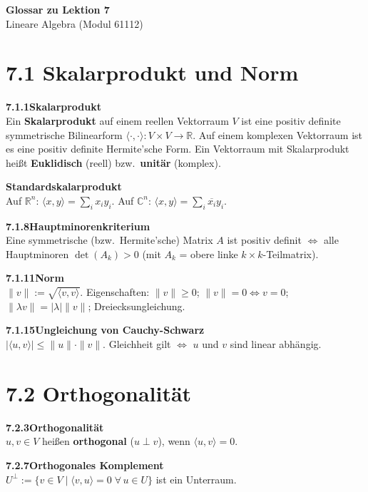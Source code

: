\documentclass[a4paper,12pt]{article}
\newcommand{\gentry}[3]{%
  \noindent\textbf{#1\quad #2}\nopagebreak\\[0.2em]
  #3\par\smallskip
}
\begin{document}
\begin{center}
  {\LARGE\bfseries Glossar zu Lektion 7}\\[0.5em]
  {\large Lineare Algebra (Modul 61112)}
\end{center}

\vspace{0.8em}

\section*{7.1 \quad Skalarprodukt und Norm}

\gentry{7.1.1}{Skalarprodukt}{%
  Ein \textbf{Skalarprodukt} auf einem reellen Vektorraum $V$ ist eine positiv definite symmetrische Bilinearform $\langle \cdot, \cdot\rangle: V \times V \to \mathbb{R}$.
  Auf einem komplexen Vektorraum ist es eine positiv definite Hermite'sche Form.
  Ein Vektorraum mit Skalarprodukt heißt \textbf{Euklidisch} (reell) bzw.\ \textbf{unitär} (komplex).
}

\gentry{}{Standardskalarprodukt}{%
  Auf $\mathbb{R}^n$: $\langle x,y\rangle = \sum_i x_i y_i$.
  Auf $\mathbb{C}^n$: $\langle x,y\rangle = \sum_i \overline{x_i} y_i$.
}

\gentry{7.1.8}{Hauptminorenkriterium}{%
  Eine symmetrische (bzw.\ Hermite'sche) Matrix $A$ ist positiv definit $\iff$ alle Hauptminoren $\det(A_k) > 0$ (mit $A_k$ = obere linke $k{\times}k$-Teilmatrix).
}

\gentry{7.1.11}{Norm}{%
  $\|v\| := \sqrt{\langle v,v\rangle}$.
  Eigenschaften: $\|v\| \geq 0$; $\|v\| = 0 \iff v = 0$; $\|\lambda v\| = |\lambda|\|v\|$; Dreiecksungleichung.
}

\gentry{7.1.15}{Ungleichung von Cauchy-Schwarz}{%
  $|\langle u,v\rangle| \leq \|u\| \cdot \|v\|$.
  Gleichheit gilt $\iff$ $u$ und $v$ sind linear abhängig.
}

\section*{7.2 \quad Orthogonalität}

\gentry{7.2.3}{Orthogonalität}{%
  $u, v \in V$ heißen \textbf{orthogonal} ($u \perp v$), wenn $\langle u, v\rangle = 0$.
}

\gentry{7.2.7}{Orthogonales Komplement}{%
  $U^\perp := \{v \in V \mid \langle v, u\rangle = 0 \;\forall\, u \in U\}$ ist ein Unterraum.
}
\end{document}
